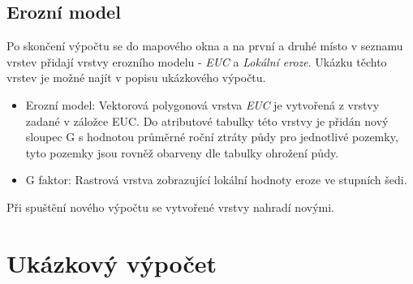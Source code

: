 \subsection{Erozní model}
Po skončení výpočtu se do mapového okna a na první a druhé místo v seznamu vrstev přidají vrstvy erozního modelu - \textit{EUC} a \textit{Lokální eroze}. Ukázku těchto vrstev je možné najít v popisu ukázkového výpočtu.
\begin{itemize}
	\item Erozní model:
	Vektorová polygonová vrstva \textit{EUC} je vytvořená z vrstvy zadané v záložce EUC. Do atributové tabulky této vrstvy je přidán nový sloupec G s hodnotou průměrné roční ztráty půdy pro jednotlivé pozemky, tyto pozemky jsou rovněž obarveny dle tabulky ohrožení půdy.
	\item G faktor:
	Rastrová vrstva zobrazující lokální hodnoty eroze ve stupních šedi.
\end{itemize}
Při spuštění nového výpočtu se vytvořené vrstvy nahradí novými.

\section{Ukázkový výpočet}
